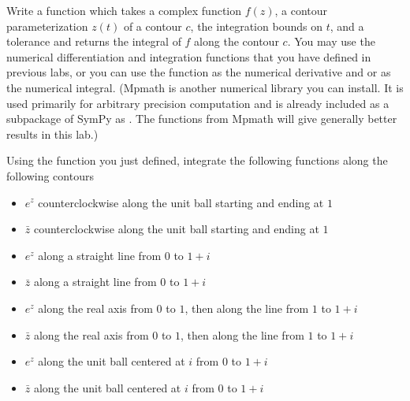 \begin{problem}
Write a function which takes a complex function $f(z)$, a contour parameterization $z(t)$ of a contour $c$, the integration bounds on $t$, and a tolerance and returns the integral of $f$ along the contour $c$.
You may use the numerical differentiation and integration functions that you have defined in previous labs, or you can use the function  as the numerical derivative and  or  as the numerical integral.
(Mpmath is another numerical library you can install.
It is used primarily for arbitrary precision computation and is already included as a subpackage of SymPy as . The functions from Mpmath will give generally better results in this lab.)
\end {problem}

\begin{problem}
Using the function you just defined, integrate the following functions along the following contours
\begin{itemize}
\item $e^z$ counterclockwise along the unit ball starting and ending at $1$
\item $\bar{z}$ counterclockwise along the unit ball starting and ending at $1$
\item $e^z$ along a straight line from $0$ to $1+i$
\item $\bar{z}$ along a straight line from $0$ to $1+i$
\item $e^z$ along the real axis from $0$ to $1$, then along the line from $1$ to $1+i$
\item $\bar{z}$ along the real axis from $0$ to $1$, then along the line from $1$ to $1+i$
\item $e^z$ along the unit ball centered at $i$ from $0$ to $1+i$
\item $\bar{z}$ along the unit ball centered at $i$ from $0$ to $1+i$
\end{itemize}
\end{problem}

